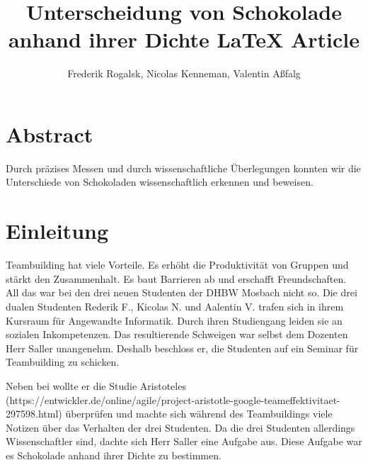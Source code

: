 \documentclass[12pt]{scrartcl}
\title{Unterscheidung von Schokolade anhand ihrer Dichte \LaTeX{} Article}
\author{Frederik Rogalsk, Nicolas Kenneman, Valentin Aßfalg}
\begin{document}
\maketitle

\section{Abstract}
Durch präzises Messen und durch wissenschaftliche Überlegungen konnten wir die Unterschiede von Schokoladen wissenschaftlich erkennen und beweisen.
\section{Einleitung}
Teambuilding hat viele Vorteile. Es erhöht die Produktivität von Gruppen und stärkt den Zusammenhalt. Es baut Barrieren ab und erschafft Freundschaften. All das war bei den drei neuen Studenten der DHBW Mosbach nicht so. Die drei dualen Studenten Rederik F., Kicolas N. und Aalentin V. trafen sich in ihrem Kursraum für Angewandte Informatik. Durch ihren Studiengang leiden sie an sozialen Inkompetenzen. Das resultierende Schweigen war selbst dem Dozenten Herr Saller unangenehm. Deshalb beschloss er, die Studenten auf ein Seminar für Teambuilding zu schicken. 

Neben bei wollte er die Studie Aristoteles (https://entwickler.de/online/agile/project-aristotle-google-teameffektivitaet-297598.html) überprüfen und machte sich während des Teambuildings viele Notizen über das Verhalten der drei Studenten. Da die drei Studenten allerdings Wissenschaftler sind, dachte sich Herr Saller eine Aufgabe aus. Diese Aufgabe war es Schokolade anhand ihrer Dichte zu bestimmen.
\end{document}
